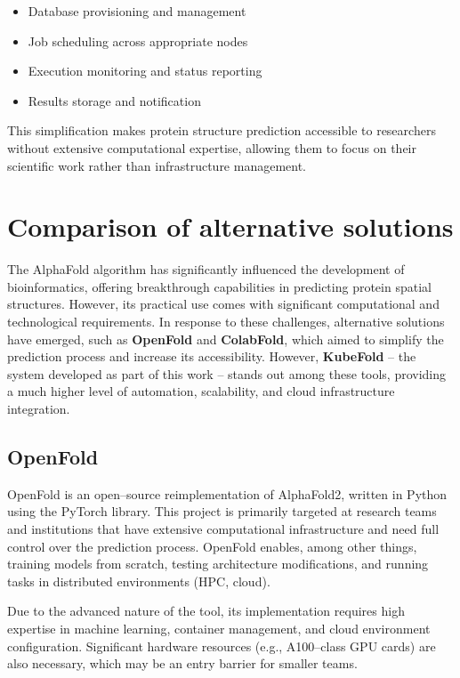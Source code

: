 \begin{itemize}
    \item Database provisioning and management
    \item Job scheduling across appropriate nodes
    \item Execution monitoring and status reporting
    \item Results storage and notification
\end{itemize}

This simplification makes protein structure prediction accessible to researchers without extensive computational expertise, allowing them to focus on their scientific work rather than infrastructure management.

\section{Comparison of alternative solutions}

The AlphaFold algorithm has significantly influenced the development of bioinformatics, offering breakthrough capabilities in predicting protein spatial structures.
However, its practical use comes with significant computational and technological requirements.
In response to these challenges, alternative solutions have emerged, such as \textbf{OpenFold}\cite{openfold} and \textbf{ColabFold}\cite{colabfold}, which aimed to simplify the prediction process and increase its accessibility.
However, \textbf{KubeFold} – the system developed as part of this work – stands out among these tools, providing a much higher level of automation, scalability, and cloud infrastructure integration.

\subsection*{OpenFold}

OpenFold is an open--source reimplementation of AlphaFold2, written in Python using the PyTorch library.
This project is primarily targeted at research teams and institutions that have extensive computational infrastructure and need full control over the prediction process.
OpenFold enables, among other things, training models from scratch, testing architecture modifications, and running tasks in distributed environments (HPC, cloud).

Due to the advanced nature of the tool, its implementation requires high expertise in machine learning, container management, and cloud environment configuration.
Significant hardware resources (e.g., A100--class GPU cards) are also necessary, which may be an entry barrier for smaller teams.

